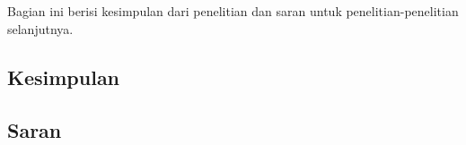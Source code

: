 \chapter{\babEnam}

Bagian ini berisi kesimpulan dari penelitian dan saran untuk penelitian-penelitian selanjutnya.

\section{Kesimpulan}


\section{Saran}
